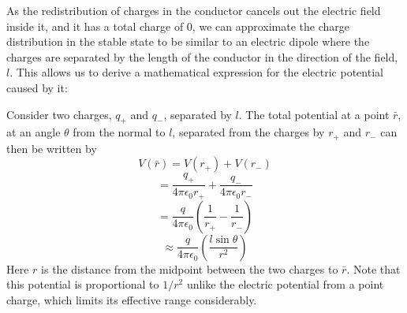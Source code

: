 \documentclass[aps,twocolumn,pre,nofootinbib]{revtex4-1}
\begin{document}
As the redistribution of charges in the conductor cancels out the electric field inside it, and it has a total charge of 0, we can approximate the charge distribution in the stable state to be similar to an electric dipole where the charges are separated by the length of the conductor in the direction of the field, $l$. This allows us to derive a mathematical expression for the electric potential caused by it:

Consider two charges, $q_+$ and $q_-$, separated by $l$. The total potential at a point $\bar{r}$, at an angle $\theta$ from the normal to $l$, separated from the charges by $r_+$ and $r_-$ can then be written by
\[V(\bar{r}) = V(r_+) + V(r_-) \]
\[ = \frac{q_+}{4 \pi \epsilon_0 r_+} + \frac{q_-}{4 \pi \epsilon_0 r_-} \]
\[ = \frac{q}{4 \pi \epsilon_0}\left( \frac{1}{r_+} - \frac{1}{r_-} \right) \]
\[ \approx \frac{q}{4 \pi \epsilon_0} \left( \frac{l \sin\theta}{r^2} \right) \]
Here $r$ is the distance from the midpoint between the two charges to $\bar{r}$. Note that this potential is proportional to $1/r^2$ unlike the electric potential from a point charge, which limits its effective range considerably.
\end{document}
